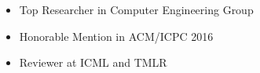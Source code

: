 \begin{minipage}{\maincolumnwidth}
{\begin{itemize}
    			\item {Top Researcher in Computer Engineering Group}%
                \item {Honorable Mention in ACM/ICPC 2016}%
                \item {Reviewer at ICML and TMLR}
		\end{itemize}}%
\end{minipage}%